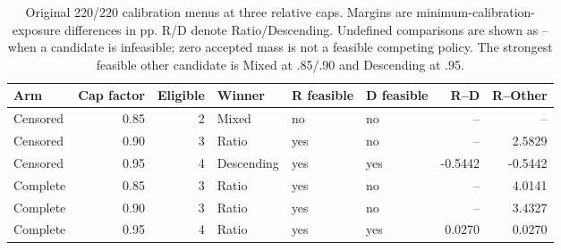 \begin{table}[t]\centering\scriptsize
\caption{Original 220/220 calibration menus at three relative caps. Margins are minimum-calibration-exposure differences in pp. R/D denote Ratio/Descending. Undefined comparisons are shown as -- when a candidate is infeasible; zero accepted mass is not a feasible competing policy. The strongest feasible other candidate is Mixed at .85/.90 and Descending at .95.}\label{tab:v8-strict}
\begin{tabular}{lrrlllrr}\toprule
Arm & Cap factor & Eligible & Winner & R feasible & D feasible & R--D & R--Other\\\midrule
Censored & 0.85 & 2 & Mixed & no & no & -- & -- \\
Censored & 0.90 & 3 & Ratio & yes & no & -- & 2.5829 \\
Censored & 0.95 & 4 & Descending & yes & yes & -0.5442 & -0.5442 \\
Complete & 0.85 & 3 & Ratio & yes & no & -- & 4.0141 \\
Complete & 0.90 & 3 & Ratio & yes & no & -- & 3.4327 \\
Complete & 0.95 & 4 & Ratio & yes & yes & 0.0270 & 0.0270 \\
\bottomrule\end{tabular}\end{table}
